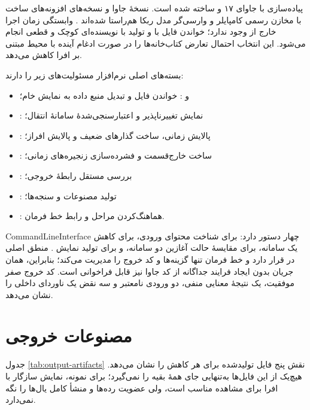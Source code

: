 پیاده‌سازی با جاوای ۱۷ و  ساخته شده است. نسخهٔ جاوا و نسخه‌های افزونه‌های ساخت با مخازن رسمی کامپایلر و وارسی‌گر مدل ربکا هم‌راستا شده‌اند \cite{RebecaCompilerGitHub2026,RebecaModelCheckerGitHub2026}. وابستگی زمان اجرا خارج از  وجود ندارد؛ خواندن فایل با  و تولید  با نویسنده‌ای کوچک و قطعی انجام می‌شود. این انتخاب احتمال تعارض کتاب‌خانه‌ها را در صورت ادغام آینده با محیط مبتنی بر  افرا کاهش می‌دهد.

بسته‌های اصلی نرم‌افزار مسئولیت‌های زیر را دارند:

\begin{itemize}
\item {} و : خواندن فایل و تبدیل منبع داده به نمایش خام؛
\item {}: نمایش تغییرناپذیر و اعتبارسنجی‌شدهٔ سامانهٔ انتقال؛
\item {}: پالایش زمانی، ساخت گذارهای ضعیف و پالایش افراز؛
\item {}: ساخت خارج‌قسمت و فشرده‌سازی زنجیره‌های زمانی؛
\item {}: بررسی مستقل رابطهٔ خروجی؛
\item {}: تولید مصنوعات و سنجه‌ها؛
\item {}: هماهنگ‌کردن مراحل و رابط خط فرمان.
\end{itemize}

\gls{CommandLineInterface} چهار دستور دارد:  برای شناخت محتوای ورودی،  برای کاهش یک سامانه،  برای مقایسهٔ حالت آغازین دو سامانه، و  برای تولید نمایش . منطق اصلی در  قرار دارد و خط فرمان تنها گزینه‌ها و کد خروج را مدیریت می‌کند؛ بنابراین، همان جریان بدون ایجاد فرایند جداگانه از کد جاوا نیز قابل فراخوانی است. کد خروج صفر موفقیت، یک نتیجهٔ معنایی منفی، دو ورودی نامعتبر و سه نقض یک ناوردای داخلی را نشان می‌دهد.

\section{مصنوعات خروجی}

جدول \ref{tab:output-artifacts} نقش پنج فایل تولیدشده برای هر کاهش را نشان می‌دهد. هیچ‌یک از این فایل‌ها به‌تنهایی جای همهٔ بقیه را نمی‌گیرد؛ برای نمونه، نمایش سازگار با افرا برای مشاهده مناسب است، ولی عضویت رده‌ها و منشأ کامل یال‌ها را نگه نمی‌دارد.

